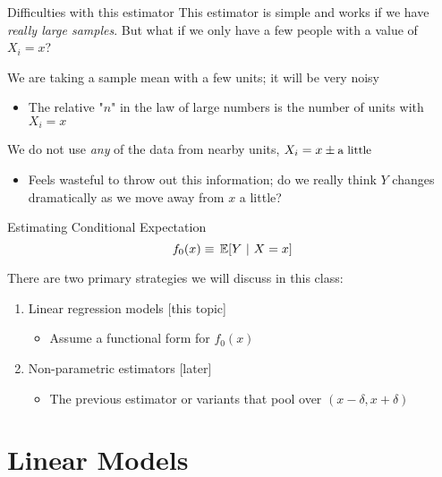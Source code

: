 \documentclass[aspectratio=169,t,11pt,table]{beamer}
\begin{document}
\begin{frame}{Difficulties with this estimator}
  This estimator is simple and works if we have \emph{really large samples}. But what if we only have a few people with a value of $X_i = x$? 
  
  \bigskip
  We are taking a sample mean with a few units; it will be very noisy
  \begin{itemize}
    \item The relative "$n$" in the law of large numbers is the number of units with $X_i = x$
  \end{itemize}

  \pause
  \bigskip
  We do not use \emph{any} of the data from nearby units, $X_i = x \pm \text{\small a little}$
  \begin{itemize}
    \item Feels wasteful to throw out this information; do we really think $Y$ changes dramatically as we move away from $x$ a little?
  \end{itemize}
\end{frame}

\begin{frame}{Estimating Conditional Expectation}
  \vspace*{-\bigskipamount}
  $$
    f_0(x) \equiv \expec{Y}{X = x}
  $$

  There are two primary strategies we will discuss in this class:

  \medskip
  \begin{enumerate}
    \item Linear regression models {\color{zinc600}\small [this topic]}
    \begin{itemize}
      \item Assume a functional form for $f_0(x)$ 
    \end{itemize}
    
    \medskip
    \item Non-parametric estimators {\color{zinc600}\small [later]}
    \begin{itemize}
      \item The previous estimator or variants that pool over $(x - \delta, x + \delta)$
    \end{itemize}
  \end{enumerate}
\end{frame}

\section{Linear Models}
\end{document}
